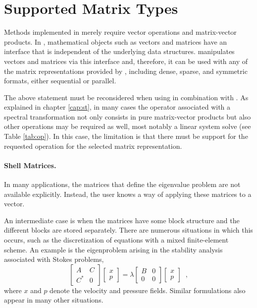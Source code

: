 \section{Supported Matrix Types}
\label{sec:supported}

Methods implemented in  merely require vector operations and matrix-vector products. In \petsc, mathematical objects such as vectors and matrices have an interface that is independent of the underlying data structures. \slepc manipulates vectors and matrices via this interface and, therefore, it can be used with any of the matrix representations provided by \petsc, including dense, sparse, and symmetric formats, either sequential or parallel.

The above statement must be reconsidered when using  in combination with . As explained in chapter \ref{cap:st}, in many cases the operator associated with a spectral transformation not only consists in pure matrix-vector products but also other operations may be required as well, most notably a linear system solve (see Table \ref{tab:op}). In this case, the limitation is that there must be support for the requested operation for the selected matrix representation. %

\paragraph{Shell Matrices.}

In many applications, the matrices that define the eigenvalue problem are not available explicitly. Instead, the user knows a way of applying these matrices to a vector.

An intermediate case is when the matrices have some block structure and the different blocks are stored separately. There are numerous situations in which this occurs, such as the discretization of equations with a mixed finite-element scheme. An example is the eigenproblem arising in the stability analysis associated with Stokes problems,
\begin{equation}
\begin{bmatrix}A & C\\C^* & 0\end{bmatrix}\begin{bmatrix}x\\p\end{bmatrix}
=\lambda\begin{bmatrix}B & 0\\0 & 0\end{bmatrix}\begin{bmatrix}x\\p\end{bmatrix}\;\;,
\end{equation}
where $x$ and $p$ denote the velocity and pressure fields. Similar formulations also appear in many other situations.

